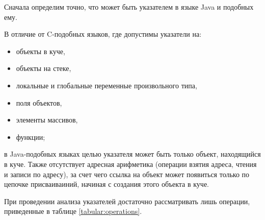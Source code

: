 \documentclass[14pt,titlepage]{extarticle}
\begin{document}
      Сначала определим точно, что может быть указателем в языке Java и
      подобных ему.

      В отличие от C-подобных языков, где допустимы указатели на:
      \begin{itemize}
        \item объекты в куче,
        \item объекты на стеке,
        \item локальные и глобальные переменные произвольного типа,
        \item поля объектов,
        \item элементы массивов,
        \item функции;
      \end{itemize}
      в Java-подобных языках целью указателя может быть только объект,
      находящийся в куче. Также отсутствует адресная арифметика (операции
      взятия адреса, чтения и записи по адресу), за счет чего ссылка на объект
      может появиться только по цепочке присваиваиний, начиная с создания этого
      объекта в куче.

      При проведении анализа указателей достаточно рассматривать лишь
      операции, приведенные в таблице \ref{tabular:operations}.
\end{document}

